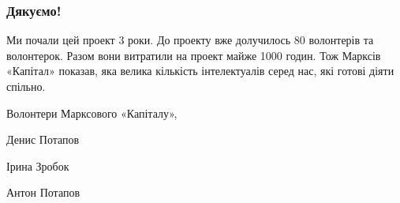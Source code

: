 \documentclass{kapital}
\begin{document}
\subsubsection*{Дякуємо!}

Ми почали цей проект 3 роки. До проекту вже долучилось 80 волонтерів та волонтерок. Разом вони витратили на проект майже 1000 годин. Тож Марксів «Капітал» показав, яка велика кількість інтелектуалів серед нас, які готові діяти спільно. 

\medskip{}

\noindent{}Волонтери Марксового «Капіталу»,

\noindent{}Денис Потапов

\noindent{}Ірина Зробок

\noindent{}Антон Потапов
\end{document}
